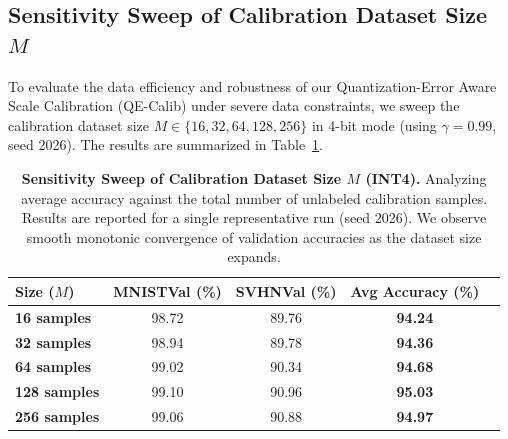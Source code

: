 \subsection{Sensitivity Sweep of Calibration Dataset Size $M$}
To evaluate the data efficiency and robustness of our Quantization-Error Aware Scale Calibration (QE-Calib) under severe data constraints, we sweep the calibration dataset size $M \in \{16, 32, 64, 128, 256\}$ in 4-bit mode (using $\gamma = 0.99$, seed 2026). The results are summarized in Table~\ref{tab:calib_sweep_results}.

\begin{table}[h]
\caption{\textbf{Sensitivity Sweep of Calibration Dataset Size $M$ (INT4).} Analyzing average accuracy against the total number of unlabeled calibration samples. Results are reported for a single representative run (seed 2026). We observe smooth monotonic convergence of validation accuracies as the dataset size expands.}
\label{tab:calib_sweep_results}
\vskip 0.15in
\begin{center}
\begin{small}
\begin{sc}
\begin{tabular}{lcccc}
\toprule
Size ($M$) & MNISTVal (\%) & SVHNVal (\%) & Avg Accuracy (\%) \\
\midrule
\textbf{16 samples} & 98.72 & 89.76 & \textbf{94.24} \\
\textbf{32 samples} & 98.94 & 89.78 & \textbf{94.36} \\
\textbf{64 samples} & 99.02 & 90.34 & \textbf{94.68} \\
\textbf{128 samples} & 99.10 & 90.96 & \textbf{95.03} \\
\textbf{256 samples} & 99.06 & 90.88 & \textbf{94.97} \\
\bottomrule
\end{tabular}
\end{sc}
\end{small}
\end{center}
\vskip -0.1in
\end{table}

